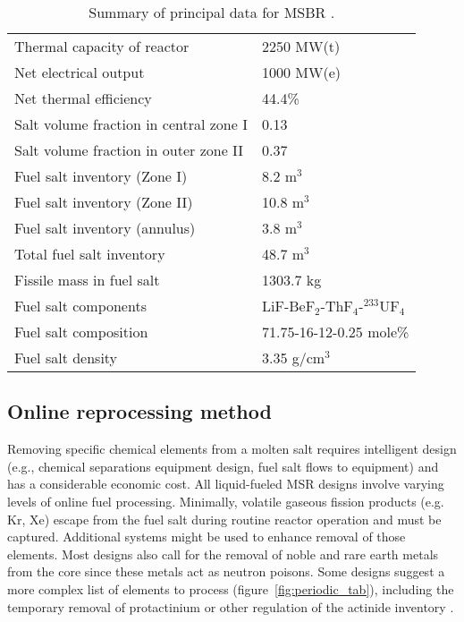 \begin{table}[h!]
        \caption{Summary of principal data for \gls{MSBR} 
        \cite{robertson_conceptual_1971}.}
        \begin{tabularx}{\textwidth}{ s  s}
        \hline
                Thermal capacity of reactor           		& 2250 MW(t)
                \\ Net electrical output                 		& 1000 
        MW(e) \\  Net thermal efficiency        				
        & 44.4\%
                \\  Salt volume fraction in central zone I		& 0.13
                \\ Salt volume fraction in outer zone II       & 0.37
                \\ Fuel salt inventory (Zone I)                & 8.2 m$^3$	
        \\ Fuel salt inventory (Zone II)               & 10.8 m$^3$	\\ Fuel 
        salt inventory (annulus)               & 3.8 m$^3$	\\  Total fuel 
        salt inventory                   & 48.7 m$^3$	\\ Fissile mass in fuel 
        salt                   & 1303.7 kg	\\ Fuel salt components                  
                               & LiF-BeF$_2$-ThF$_4$-$^{233}$UF$_4$	\\  
        Fuel salt composition                 & 71.75-16-12-0.25 mole\%
                \\
                Fuel salt density                    & 3.35 g/cm$^3$
                \\ \hline
        \end{tabularx}
        \label{tab:msbr_tab}
\end{table}

\subsection{Online reprocessing method}
Removing specific chemical elements from a molten salt 
requires intelligent design (e.g., chemical separations equipment design, 
fuel salt flows to equipment) and has a considerable economic cost. All 
liquid-fueled \gls{MSR} designs involve varying levels of online fuel 
processing. Minimally, volatile gaseous fission products (e.g. Kr, Xe) escape 
from the fuel salt during routine reactor operation and must be captured. 
Additional systems might be used to enhance removal of those elements. Most 
designs also call for the removal of noble and rare earth metals from the core 
since these metals act as neutron poisons. Some designs suggest a more complex 
list of elements to process (figure~\ref{fig:periodic_tab}), including the 
temporary removal of protactinium or other regulation of the 
actinide inventory \cite{ahmad_neutronics_2015}.

